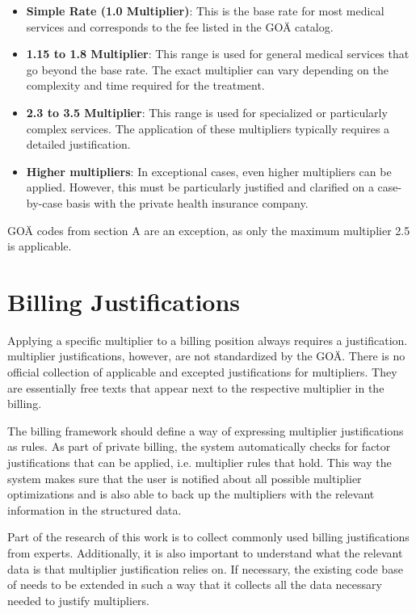 \begin{itemize}
    \item \textbf{Simple Rate (1.0 Multiplier)}: This is the base rate for most medical services and corresponds to the fee listed in the GOÄ catalog.
    \item \textbf{1.15 to 1.8 Multiplier}: This range is used for general medical services that go beyond the base rate.
    The exact multiplier can vary depending on the complexity and time required for the treatment.
    \item \textbf{2.3 to 3.5 Multiplier}: This range is used for specialized or particularly complex services.
    The application of these multipliers typically requires a detailed justification.
    \item \textbf{Higher multipliers}: In exceptional cases, even higher multipliers can be applied.
    However, this must be particularly justified and clarified on a case-by-case basis with the private health insurance company.
\end{itemize}

GOÄ codes from section A are an exception, as only the maximum multiplier 2.5 is applicable\cite[]{hermanns2011gebuhrenordnung}.


\section{Billing Justifications}\label{sec:billing-justifications}

Applying a specific multiplier to a billing position always requires a justification.
multiplier justifications, however, are not standardized by the GOÄ\cite[]{bruck1998kommentar}.
There is no official collection of applicable and excepted justifications for multipliers.
They are essentially free texts that appear next to the respective multiplier in the billing.


The billing framework should define a way of expressing multiplier justifications as rules.
As part of private billing, the system automatically checks for factor justifications that can be applied, i.e. multiplier rules that hold.
This way the system makes sure that the user is notified about all possible multiplier optimizations and is also able to back up the multipliers with the relevant information in the structured data.

Part of the research of this work is to collect commonly used billing justifications from experts.
Additionally, it is also important to understand what the relevant data is that multiplier justification relies on.
If necessary, the existing code base of \AV needs to be extended in such a way that it collects all the data necessary needed to justify multipliers.

